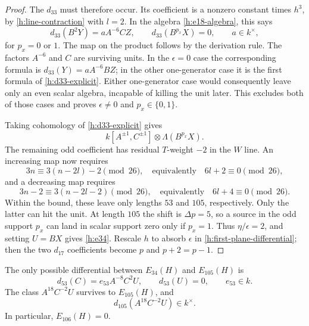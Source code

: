 \begin{proof}
The $d_{33}$ must therefore occur. Its coefficient is a nonzero
constant times $h^3$, by \eqref{h:line-contraction} with $l=2$.
In the algebra \eqref{h:e18-algebra}, this says
\begin{equation}
 \label{h:d33-explicit}
 d_{33}(B^2Y)=aA^{-6}CZ,\qquad
 d_{33}(B^{p_x}X)=0,\qquad a\in k^{\times},
\end{equation}
for $p_x=0$ or $1$. The map on the product follows by the derivation
rule. The factors $A^{-6}$ and $C$ are surviving units. In the
$\epsilon=0$ case the corresponding formula is
$d_{33}(Y)=aA^{-6}BZ$; in the other one-generator case it is the
first formula of \eqref{h:d33-explicit}. Either one-generator case
would consequently leave only an even scalar algebra, incapable of
killing the unit later. This excludes both of those cases and proves
$\epsilon\ne0$ and $p_x\in\{0,1\}$.

Taking cohomology of \eqref{h:d33-explicit} gives
\[
 k[A^{\pm1},C^{\pm1}]\otimes\Lambda(B^{p_x}X).
\]
The remaining odd coefficient has residual $T$-weight $-2$ in the
$W$ line. An increasing map now requires
\[
 3n\equiv3(n-2l)-2\pmod{26},
 \quad\text{equivalently}\quad 6l+2\equiv0\pmod{26},
\]
and a decreasing map requires
\[
 3n-2\equiv3(n-2l-2)\pmod{26},
 \quad\text{equivalently}\quad 6l+4\equiv0\pmod{26}.
\]
Within the bound, these leave only lengths $53$ and $105$,
respectively. Only the latter can hit the unit. At length $105$ the
shift is $\Delta p=5$, so a source in the odd support $p_x$ can
land in scalar support zero only if $p_x=1$. Thus
$\eta/\epsilon=2$, and setting $U=BX$ gives \eqref{h:e34}.
Rescale $h$ to absorb $\epsilon$ in
\eqref{h:first-plane-differential}; then the two $d_{17}$
coefficients become $p$ and $p+2=p-1$.
\end{proof}

\begin{proposition}
 \label{h:unit-death}
 The only possible differential between $E_{34}(H)$ and $E_{105}(H)$
 is
 \begin{equation}
 \label{h:d53}
 d_{53}(C)=e_{53}A^{-8}C^2U,\qquad d_{53}(U)=0,
 \qquad e_{53}\in k.
 \end{equation}
 The class $A^{18}C^{-2}U$ survives to $E_{105}(H)$, and
 \begin{equation}
 \label{h:d105}
 d_{105}(A^{18}C^{-2}U)\in k^{\times}.
 \end{equation}
 In particular, $E_{106}(H)=0$.
\end{proposition}

